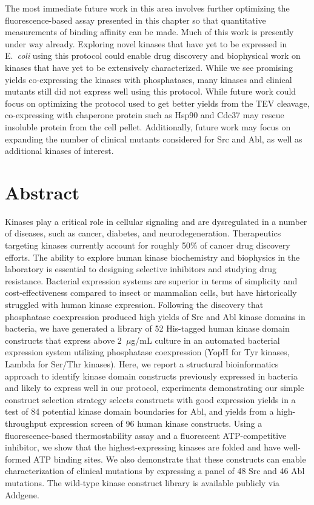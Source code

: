 \documentclass[phd,tocprelim]{cornell}
\begin{document}
The most immediate future work in this area involves further optimizing the fluorescence-based assay presented in this chapter so that quantitative measurements of binding affinity can be made. Much of this work is presently under way already. Exploring novel kinases that have yet to be expressed in E.~\emph{coli} using this protocol could enable drug discovery and biophysical work on kinases that have yet to be extensively characterized. While we see promising yields co-expressing the kinases with phosphatases, many kinases and clinical mutants still did not express well using this protocol. While future work could focus on optimizing the protocol used to get better yields from the TEV cleavage, co-expressing with chaperone protein such as Hsp90 and Cdc37 may rescue insoluble protein from the cell pellet. Additionally, future work may focus on expanding the number of clinical mutants considered for Src and Abl, as well as additional kinases of interest. 

\section{Abstract}
Kinases play a critical role in cellular signaling and are dysregulated in a number of diseases, such as cancer, diabetes, and neurodegeneration. 
Therapeutics targeting kinases currently account for roughly 50\% of cancer drug discovery efforts. The ability to explore human kinase biochemistry and biophysics in the laboratory is essential to designing selective inhibitors and studying drug resistance. 
Bacterial expression systems are superior in terms of simplicity and cost-effectiveness compared to insect or mammalian cells, but have historically struggled with human kinase expression.
Following the discovery that phosphatase coexpression produced high yields of Src and Abl kinase domains in bacteria, we have generated a library of 52 His-tagged human kinase domain constructs that express above 2~$\mu$g/mL culture in an automated bacterial expression system utilizing phosphatase coexpression (YopH for Tyr kinases, Lambda for Ser/Thr kinases). 
Here, we report a structural bioinformatics approach to identify kinase domain constructs previously expressed in bacteria and likely to express well in our protocol, experiments demonstrating our simple construct selection strategy selects constructs with good expression yields in a test of 84 potential kinase domain boundaries for Abl, and yields from a high-throughput expression screen of 96 human kinase constructs.
Using a fluorescence-based thermostability assay and a fluorescent ATP-competitive inhibitor, we show that the highest-expressing kinases are folded and have well-formed ATP binding sites.
We also demonstrate that these constructs can enable characterization of clinical mutations by expressing a panel of 48 Src and 46 Abl mutations. 
The wild-type kinase construct library is available publicly via Addgene. 
\end{document}

